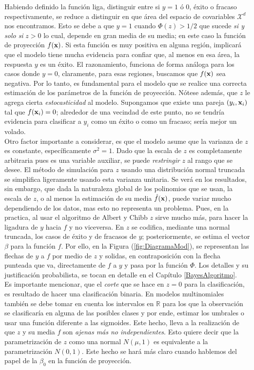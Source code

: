 \documentclass[../Main/Main.tex]{subfiles}
\begin{document}
Habiendo definido la función liga, distinguir entre si $y = 1$ ó 0, éxito o fracaso respectivamente, se reduce a distinguir en que área del espacio de covariables $\mathcal{X}^d$ nos encontramos. Esto se debe a que $y = 1$ cuando $\Phi(z) > 1/2$ que sucede \textit{si y solo si} $z>0$ lo cual, depende en gran media de su media; en este caso la función de proyección $f(\mathbf{x})$. Si esta función es muy positiva en alguna región, implicará que el modelo tiene mucha evidencia para confiar que, al menos en esa área, la respuesta $y$ es un éxito. El razonamiento, funciona de forma análoga para los casos donde $y = 0$, claramente, para esas regiones, buscamos que $f(\mathbf{x})$ sea negativa. Por lo tanto, es fundamental para el modelo que se realice una correcta estimación de los parámetros de la función de proyección.  Nótese además, que $z$ le agrega cierta \textit{estocasticidad} al modelo. Supongamos que existe una pareja $(y_i,\mathbf{x}_i)$ tal que $f(\mathbf{x}_i) = 0$; alrededor de una vecindad de este punto, no se tendría evidencia para clasificar a $y_i$ como un éxito o como un fracaso; sería mejor un volado.\\ 

Otro factor importante a considerar, es que el modelo asume que la varianza de $z$ es constante, específicamente $\sigma^2 = 1$. Dado que la escala de $z$ es completamente arbitraria pues es una variable auxiliar, se puede \textit{restringir} $z$ al rango que se desee. El método de simulación para $z$ usando una distribución normal truncada se simplifica ligeramente usando esta varianza unitaria. Se verá en los resultados, sin embargo, que dada la naturaleza global de los polinomios que se usan, la escala de $z$, o al menos la estimación de su media $\hat{f}(\mathbf{x})$, puede variar mucho dependiendo de los datos, mas esto no representa un problema. Pues, en la practica, al  usar el algoritmo de Albert y Chibb $z$ sirve mucho más, para hacer la ligadura de $y$ hacia $f$ y no viceversa. En $z$ se codifica, mediante una normal truncada, los casos de éxito y de fracasos de $y$; posteriormente, se estima el vector $\beta$ para la función $f$. Por ello, en la Figura (\ref{fig:DiagramaMod}), se representan las flechas de $y$ a $f$ por medio de $z$ y solidas, en contraposición con la flecha punteada que va, directamente de $f$ a $y$ y pasa por la función $\Phi$. Los detalles y su justificación probabilista, se tocan en detalle en el Capítulo \ref{BayesAlgoritmo}.\\

Es importante mencionar, que el \textit{corte} que se hace en $z = 0$ para la clasificación, es resultado de hacer una clasificación binaria. En modelos multinomiales también se debe tomar en cuenta los intervalos en $\mathbb{R}$ para los que la observación se clasificaría en alguna de las posibles clases y por ende, estimar los umbrales o usar una función diferente a las sigmoides. Este hecho, lleva a la realización de que $z$ y su media $f$ son \textit{ajenas más no independientes}. Esto quiere decir que la parametrización de $z$ como una normal $N(\mu,1)$ es equivalente a la parametrización $N(0,1)$. Este hecho se hará más claro cuando hablemos del papel de la $\beta_0$ en la función de proyección. \\ 
\end{document}

